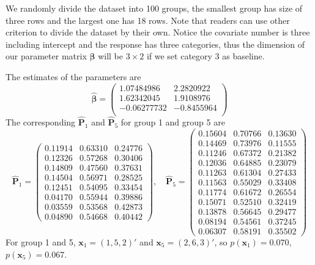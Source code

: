 \documentclass[12pt]{article}
\newcommand{\betavec}{{\boldsymbol{\beta}}}
\newcommand{\Pmat}{\mathbf{P}}
\newcommand{\wh}{\widehat}
\newcommand{\xvec}{\boldsymbol{x}}
\begin{document}
We randomly divide the dataset into 100 groups, the smallest group has size of three rows and the largest one has 18 rows. Note that readers can use other criterion to divide the dataset by their own. Notice the covariate number is three including intercept and the response has three categories, thus the dimension of our parameter matrix $\betavec$ will be $3 \times 2$ if we set category 3 as baseline.

The estimates of the parameters are
\begin{equation*}
\wh{\betavec} =
\begin{pmatrix}
 1.07484986 & 2.2820922 \\
 1.62342045 & 1.9108976 \\
 -0.06277732 &-0.8455964\\
\end{pmatrix}
\end{equation*}
The corresponding $\wh{\Pmat}_1$ and $\wh{\Pmat}_5$ for group 1 and group 5 are
\begin{equation*}
    \wh{\Pmat}_1 = \begin{pmatrix}

 0.11914 & 0.63310 & 0.24776\\
 0.12326 & 0.57268 & 0.30406\\
 0.14809 & 0.47560 & 0.37631\\
 0.14504 & 0.56971 & 0.28525\\
 0.12451 & 0.54095 & 0.33454\\
 0.04170 & 0.55944 & 0.39886\\
 0.03559 & 0.53568 & 0.42873\\
 0.04890 & 0.54668 & 0.40442
    \end{pmatrix}, \quad
    \wh{\Pmat}_5= \begin{pmatrix}
 0.15604 & 0.70766 & 0.13630\\
 0.14469 & 0.73976 & 0.11555\\
 0.11246 & 0.67372 & 0.21382\\
 0.12036 & 0.64885 & 0.23079\\
 0.11263 & 0.61304 & 0.27433\\
 0.11563 & 0.55029 & 0.33408\\
 0.11774 & 0.61672 & 0.26554\\
 0.15071 & 0.52510 & 0.32419\\
 0.13878 & 0.56645 & 0.29477\\
 0.08194 & 0.54561 & 0.37245\\
 0.06307 & 0.58191 & 0.35502
    \end{pmatrix}
\end{equation*}
For group 1 and 5, $\xvec_1 = (1,5,2)'$ and $\xvec_5 = (2,6,3)'$, so $p(\xvec_1) = 0.070$, $p(\xvec_5) = 0.067$.
\end{document}
